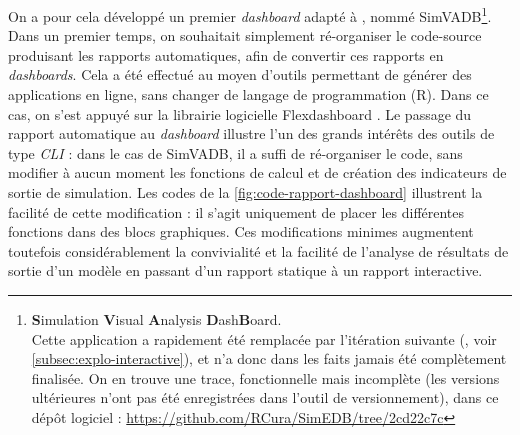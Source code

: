 On a pour cela développé un premier \textit{dashboard} adapté à \simfeodal{}, nommé SimVADB\footnote{
	\textbf{S}imulation \textbf{V}isual \textbf{A}nalysis \textbf{D}ash\textbf{B}oard.\\
	Cette application a rapidement été remplacée par l'itération suivante (\simedb{}, voir \cref{subsec:explo-interactive}), et n'a donc dans les faits jamais été complètement finalisée. On en trouve une trace, fonctionnelle mais incomplète (les versions ultérieures n'ont pas été enregistrées dans l'outil de versionnement), dans ce dépôt logiciel :
	\href{https://github.com/RCura/SimEDB/tree/2cd22c7ccfbcf31f4a09550c2396932c46ef2622}{https://github.com/RCura/SimEDB/tree/2cd22c7c}
}.
Dans un premier temps, on souhaitait simplement ré-organiser le code-source produisant les rapports automatiques, afin de convertir ces rapports en \textit{dashboards}.
Cela a été effectué au moyen d'outils permettant de générer des applications en ligne, sans changer de langage de programmation (R).
Dans ce cas, on s'est appuyé sur la librairie logicielle \textsf{Flexdashboard} \autocite{iannone_flexdashboard_2018}.
Le passage du rapport automatique au \textit{dashboard} illustre l'un des grands intérêts des outils de type \textit{CLI} : dans le cas de SimVADB, il a suffi de ré-organiser le code, sans modifier à aucun moment les fonctions de calcul et de création des indicateurs de sortie de simulation.
Les codes de la \cref{fig:code-rapport-dashboard} illustrent la facilité de cette modification : il s'agit uniquement de placer les différentes fonctions dans des blocs graphiques.
Ces modifications minimes augmentent toutefois considérablement la convivialité et la facilité de l'analyse de résultats de sortie d'un modèle en passant d'un rapport statique à un rapport interactive.

